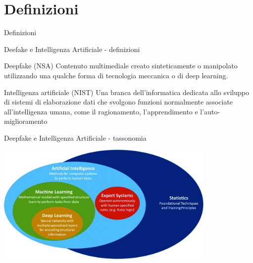 \documentclass[11pt]{beamer}
\begin{document}
\section{Definizioni}

\begin{frame}
\begin{center}
\Huge
Definizioni
\end{center}
\end{frame}

\begin{frame}{Deefake e Intelligenza Artificiale - definizioni}

\begin{alertblock}{Deepfake (NSA) \cite{nsa_definition}}
Contenuto multimediale creato sinteticamente o manipolato utilizzando una qualche forma di tecnologia meccanica o di deep learning.
\end{alertblock}

\begin{alertblock}{Intelligenza artificiale (NIST) \cite{nist_definitioN_AI}}
Una branca dell'informatica dedicata allo sviluppo di sistemi di elaborazione dati che svolgono funzioni normalmente associate all'intelligenza umana, come il ragionamento, l'apprendimento e l'auto-miglioramento
\end{alertblock}

\end{frame}

\begin{frame}{Deepfake e Intelligenza Artificiale - tassonomia \cite{tassonomia}}

\begin{center}
\includegraphics[width=0.8\textwidth]{Pic/IA_classification.jpg}
\end{center}

\end{frame}
\end{document}
